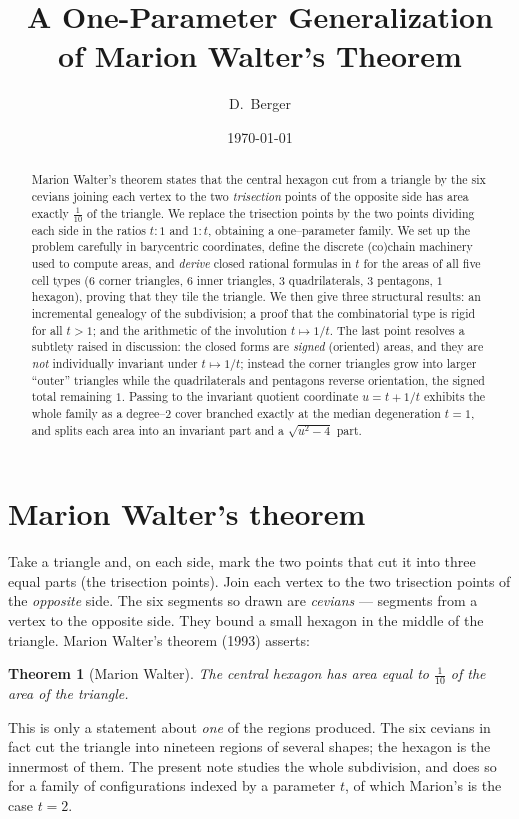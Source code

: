 \documentclass[11pt,a4paper,reqno]{amsart}
\title[A generalization of Marion Walter's theorem]{A One-Parameter Generalization\\ of Marion Walter's Theorem}
\author{D.~Berger}
\date{\today}
\newtheorem{theorem}{Theorem}[section]
\theoremstyle{definition}
\theoremstyle{remark}
\begin{document}
\begin{abstract}\noindent
Marion Walter's theorem states that the central hexagon cut from a triangle by the six cevians joining each
vertex to the two \emph{trisection} points of the opposite side has area exactly $\tfrac{1}{10}$ of the triangle.
We replace the trisection points by the two points dividing each side in the ratios $t:1$ and $1:t$, obtaining a
one--parameter family. We set up the problem carefully in barycentric coordinates, define the discrete
(co)chain machinery used to compute areas, and \emph{derive} closed rational formulas in $t$ for the areas of all
five cell types ($6$ corner triangles, $6$ inner triangles, $3$ quadrilaterals, $3$ pentagons, $1$ hexagon),
proving that they tile the triangle. We then give three structural results: an incremental genealogy of the
subdivision; a proof that the combinatorial type is rigid for all $t>1$; and the arithmetic of the involution
$t\mapsto1/t$. The last point resolves a subtlety raised in discussion: the closed forms are \emph{signed}
(oriented) areas, and they are \emph{not} individually invariant under $t\mapsto1/t$; instead the corner triangles
grow into larger ``outer'' triangles while the quadrilaterals and pentagons reverse orientation, the signed total
remaining $1$. Passing to the invariant quotient coordinate $u=t+1/t$ exhibits the whole family as a degree--$2$
cover branched exactly at the median degeneration $t=1$, and splits each area into an invariant part and a
$\sqrt{u^2-4}$ part.
\end{abstract}

\maketitle

\tableofcontents

\section{Marion Walter's theorem}
Take a triangle and, on each side, mark the two points that cut it into three equal parts (the trisection
points). Join each vertex to the two trisection points of the \emph{opposite} side. The six segments so drawn are
\emph{cevians} --- segments from a vertex to the opposite side. They bound a small hexagon in the middle of the
triangle. Marion Walter's theorem (1993) asserts:
\begin{theorem}[Marion Walter]
The central hexagon has area equal to $\tfrac1{10}$ of the area of the triangle.
\end{theorem}
This is only a statement about \emph{one} of the regions produced. The six cevians in fact cut the triangle into
nineteen regions of several shapes; the hexagon is the innermost of them. The present note studies the whole
subdivision, and does so for a family of configurations indexed by a parameter $t$, of which Marion's is the case
$t=2$.
\end{document}
